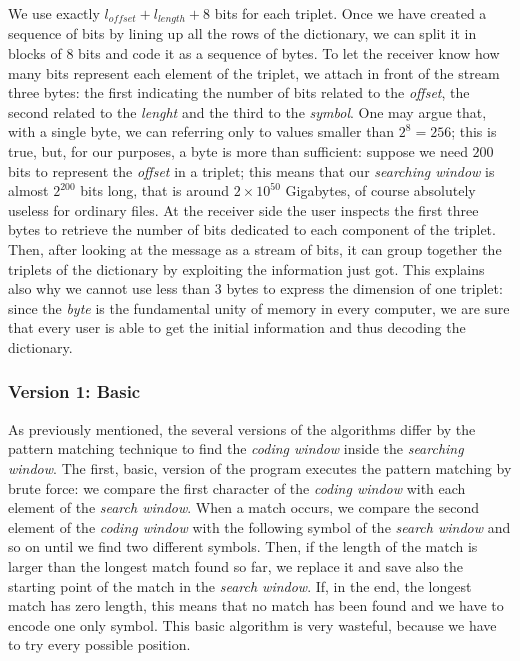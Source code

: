 We use exactly $l_{offset} + l_{length} + 8$ bits for each triplet. Once we have created a sequence of bits by lining up all the rows of the dictionary, we can split it in blocks of $8$ bits and code it as a sequence of bytes. To let the receiver know how many bits represent each element of the triplet, we attach in front of the stream three bytes: the first indicating the number of bits related to the \textit{offset}, the second related to the \textit{lenght} and the third to the \textit{symbol}. One may argue that, with a single byte, we can referring only to values smaller than $2^8 = 256$; this is true, but, for our purposes, a byte is more than sufficient: suppose we need $200$ bits to represent the \textit{offset} in a triplet; this means that our \textit{searching window} is almost $2^{200}$ bits long, that is around $2 \times 10^{50}$ Gigabytes, of course absolutely useless for ordinary files. At the receiver side the user inspects the first three bytes to retrieve the number of bits dedicated to each component of the triplet. Then, after looking at the message as a stream of bits, it can group together the triplets of the dictionary by exploiting the information just got. This explains also why we cannot use less than $3$ bytes to express the dimension of one triplet: since the \textit{byte} is the fundamental unity of memory in every computer, we are sure that every user is able to get the initial information and thus decoding the dictionary. 

\subsubsection{Version 1: Basic}
As previously mentioned, the several versions of the algorithms differ by the pattern matching technique to find the \textit{coding window} inside the \textit{searching window}. The first, basic, version of the program executes the pattern matching by brute force: we compare the first character of the \textit{coding window} with each element of the \textit{search window}. When a match occurs, we compare the second element of the \textit{coding window} with the following symbol of the \textit{search window} and so on until we find two different symbols. Then, if the length of the match is larger than the longest match found so far, we replace it and save also the starting point of the match in the \textit{search window}. If, in the end, the longest match has zero length, this means that no match has been found and we have to encode one only symbol. This basic algorithm is very wasteful, because we have to try every possible position.


